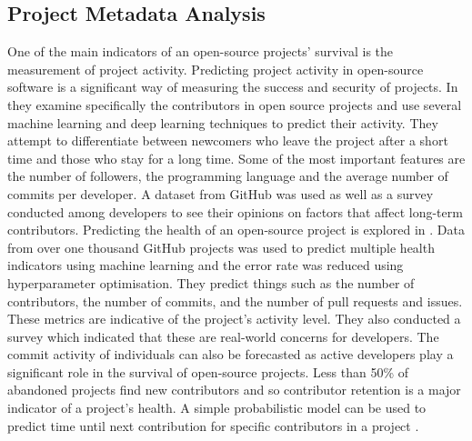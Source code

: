 \documentclass[10pt, compsoc, conference]{IEEEtran}
\begin{document}
\subsection{Project Metadata Analysis}
One of the main indicators of an open-source projects' survival is the measurement of project activity. Predicting project activity in open-source software is a significant way of measuring the success and security of projects. In \cite{l_bao_large_2021} they examine specifically the contributors in open source projects and use several machine learning and deep learning techniques to predict their activity. They attempt to differentiate between newcomers who leave the project after a short time and those who stay for a long time. Some of the most important features are the number of followers, the programming language and the average number of commits per developer. A dataset from GitHub was used as well as a survey conducted among developers to see their opinions on factors that affect long-term contributors. Predicting the health of an open-source project is explored in \cite{xia_predicting_2022}. Data from over one thousand GitHub projects was used to predict multiple health indicators using machine learning and the error rate was reduced using hyperparameter optimisation. They predict things such as the number of contributors, the number of commits, and the number of pull requests and issues. These metrics are indicative of the project’s activity level. They also conducted a survey which indicated that these are real-world concerns for developers. The commit activity of individuals can also be forecasted as active developers play a significant role in the survival of open-source projects. Less than 50\% of abandoned projects find new contributors and so contributor retention is a major indicator of a project's health. A simple probabilistic model can be used to predict time until next contribution for specific contributors in a project \cite{decan_gap_2020}.
\end{document}
